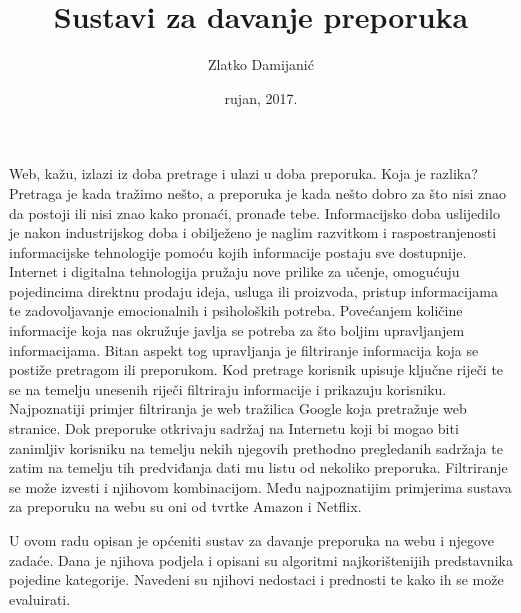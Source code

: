 \documentclass[a4paper,oneside,12pt]{memoir} %
\title{Sustavi za davanje preporuka}
\author{Zlatko Damijanić}
\date{rujan, 2017.}  %
\begin{document}
\renewcommand\thelstlisting{\arabic{chapter}.\arabic{lstlisting}.}


\frontmatter %
\begin{intro}
Web, kažu, izlazi iz doba pretrage i ulazi u doba preporuka. Koja je razlika? Pretraga je kada tražimo nešto, a preporuka je kada nešto dobro za što nisi znao da postoji ili nisi znao kako pronaći, pronađe tebe. Informacijsko doba uslijedilo je nakon industrijskog doba i obilježeno je naglim razvitkom i raspostranjenosti informacijske tehnologije pomoću kojih informacije postaju sve dostupnije. Internet i digitalna tehnologija pružaju nove prilike za učenje, omogućuju pojedincima direktnu prodaju ideja, usluga ili proizvoda, pristup informacijama te zadovoljavanje emocionalnih i psiholoških potreba. Povećanjem količine informacije koja nas okružuje javlja se potreba za što boljim upravljanjem informacijama. Bitan aspekt tog upravljanja je filtriranje informacija koja se postiže pretragom ili preporukom. Kod pretrage korisnik upisuje ključne riječi te se na temelju unesenih riječi filtriraju informacije i prikazuju korisniku. Najpoznatiji primjer filtriranja je web tražilica Google koja pretražuje web stranice. Dok preporuke otkrivaju sadržaj na Internetu koji bi mogao biti zanimljiv korisniku na temelju nekih njegovih prethodno pregledanih sadržaja te zatim na temelju tih predviđanja dati mu listu od nekoliko preporuka. Filtriranje se može izvesti i njihovom kombinacijom. Među najpoznatijim primjerima sustava za  preporuku na webu su oni od tvrtke Amazon i Netflix.
\par 
U ovom radu opisan je općeniti sustav za davanje preporuka na webu i njegove zadaće. Dana je njihova podjela i opisani su algoritmi najkorištenijih predstavnika pojedine kategorije. Navedeni su njihovi nedostaci i prednosti te kako ih se može evaluirati.
\end{intro}
\end{document}
